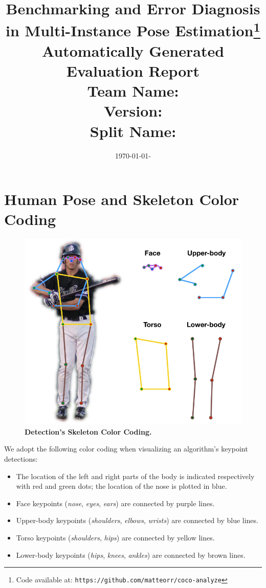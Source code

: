 \documentclass[10pt,onecolumn,letterpaper]{article}
\begin{document}
\title{Benchmarking and Error Diagnosis in Multi-Instance Pose Estimation\footnote{Code available at: \texttt{https://github.com/matteorr/coco-analyze}}\\
Automatically Generated Evaluation Report\\[1.5ex]
\textbf{Team Name:}  \\[1.5ex]
\textbf{Version:}    \\[1.5ex]
\textbf{Split Name:} }
\date{\today - \currenttime}
\maketitle


\section{Human Pose and Skeleton Color Coding}
\begin{figure}
\includegraphics[width=\linewidth]{./latex/color_coding.pdf}
\caption{ {\small \textbf{Detection's Skeleton Color Coding.}}}
\end{figure}
We adopt the following color coding when visualizing an algorithm's keypoint detections:
\begin{itemize}
    \item The location of the left and right parts of the body is indicated respectively with red and green dots; the location of the nose is plotted in blue.%
    \item Face keypoints (\textit{nose}, \textit{eyes}, \textit{ears}) are connected by purple lines.
    \item Upper-body keypoints (\textit{shoulders}, \textit{elbows}, \textit{wrists}) are connected by blue lines.
    \item Torso keypoints (\textit{shoulders}, \textit{hips}) are connected by yellow lines.
    \item Lower-body keypoints (\textit{hips}, \textit{knees}, \textit{ankles}) are connected by brown lines.
\end{itemize}
\end{document}
